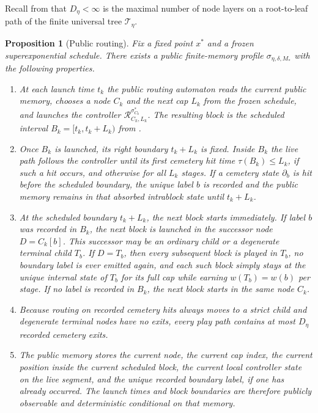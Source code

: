 \documentclass[12pt]{article}
\newtheorem{proposition}[theorem]{Proposition}
\theoremstyle{definition}
\newcommand{\1}{\mathbf{1}}
\newcommand{\cT}{\mathcal{T}}
\begin{document}
Recall from  that $D_\eta<\infty$ is the maximal number of
node layers on a root-to-leaf path of the finite universal tree $\cT_\eta$.

\begin{proposition}[Public routing]
\label{prop:public-routing}
Fix a fixed point $x^*$ and a frozen superexponential schedule. There exists a
public finite-memory profile $\sigma_{\eta,\delta,M_*}$ with the following
properties.
\begin{enumerate}[label=\textnormal{(R\arabic*)},leftmargin=2.8em]
\item At each launch time $t_k$ the public routing automaton reads the current
public memory, chooses a node $C_k$ and the next cap $L_k$ from the frozen
schedule, and launches the controller $\mathcal R_{C_k,L_k}^{\sigma_{C_k}^*}$.
The resulting block is the scheduled interval $B_k=[t_k,t_k+L_k)$ from
.
\item Once $B_k$ is launched, its right boundary $t_k+L_k$ is fixed. Inside $B_k$
the live path follows the controller until its first cemetery hit time
$\tau(B_k)\le L_k$, if such a hit occurs, and otherwise for all $L_k$ stages. If
a cemetery state $\partial_b$ is hit before the scheduled boundary, the unique
label $b$ is recorded and the public memory remains in that absorbed intrablock
state until $t_k+L_k$.
\item At the scheduled boundary $t_k+L_k$, the next block starts immediately. If
label $b$ was recorded in $B_k$, the next block is launched in the successor node
$D=C_k[b]$. This successor may be an ordinary child or a degenerate terminal
child $T_b$. If $D=T_b$, then every subsequent block is played in $T_b$, no
boundary label is ever emitted again, and each such block simply stays at the
unique internal state of $T_b$ for its full cap while earning $w(T_b)=w(b)$ per
stage. If no label is recorded in $B_k$, the next block starts in the same node
$C_k$.
\item Because routing on recorded cemetery hits always moves to a strict child and
degenerate terminal nodes have no exits, every play path contains at most
$D_\eta$ recorded cemetery exits.
\item The public memory stores the current node, the current cap index, the
current position inside the current scheduled block, the current local controller
state on the live segment, and the unique recorded boundary label, if one has
already occurred. The launch times and block boundaries are therefore publicly
observable and deterministic conditional on that memory.
\end{enumerate}
\end{proposition}
\end{document}
